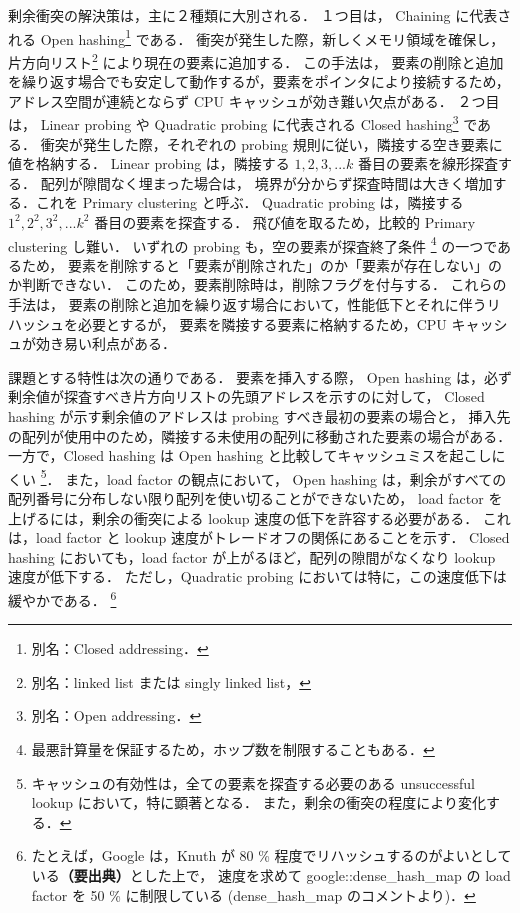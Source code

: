 剰余衝突の解決策は，主に２種類に大別される．
１つ目は，
Chaining に代表される Open hashing\footnote{別名：Closed addressing．} である．
衝突が発生した際，新しくメモリ領域を確保し，片方向リスト\footnote{別名：linked list または singly linked list，} により現在の要素に追加する．
この手法は，
要素の削除と追加を繰り返す場合でも安定して動作するが，要素をポインタにより接続するため，
アドレス空間が連続とならず CPU キャッシュが効き難い欠点がある．
２つ目は，
Linear probing や Quadratic probing に代表される Closed hashing\footnote{別名：Open addressing．} である．
衝突が発生した際，それぞれの probing 規則に従い，隣接する空き要素に値を格納する．
Linear probing は，隣接する $1, 2, 3, ... k$ 番目の要素を線形探査する．
配列が隙間なく埋まった場合は，
境界が分からず探査時間は大きく増加する．これを Primary clustering と呼ぶ．
Quadratic probing は，隣接する $1^2, 2^2, 3^2, ... k^2$ 番目の要素を探査する．
飛び値を取るため，比較的 Primary clustering し難い．
いずれの probing も，空の要素が探査終了条件 \footnote{最悪計算量を保証するため，ホップ数を制限することもある．} の一つであるため，
要素を削除すると「要素が削除された」のか「要素が存在しない」のか判断できない．
このため，要素削除時は，削除フラグを付与する．
これらの手法は，
要素の削除と追加を繰り返す場合において，性能低下とそれに伴うリハッシュを必要とするが，
要素を隣接する要素に格納するため，CPU キャッシュが効き易い利点がある．

課題とする特性は次の通りである．
要素を挿入する際，
Open hashing は，必ず剰余値が探査すべき片方向リストの先頭アドレスを示すのに対して，
Closed hashing が示す剰余値のアドレスは probing すべき最初の要素の場合と，
挿入先の配列が使用中のため，隣接する未使用の配列に移動された要素の場合がある．
一方で，Closed hashing は Open hashing と比較してキャッシュミスを起こしにくい
\footnote{キャッシュの有効性は，全ての要素を探査する必要のある unsuccessful lookup において，特に顕著となる．
また，剰余の衝突の程度により変化する．}．
また，load factor の観点において，
Open hashing は，剰余がすべての配列番号に分布しない限り配列を使い切ることができないため，
load factor を上げるには，剰余の衝突による lookup 速度の低下を許容する必要がある．
これは，load factor と  lookup 速度がトレードオフの関係にあることを示す．
Closed hashing においても，load factor が上がるほど，配列の隙間がなくなり lookup 速度が低下する．
ただし，Quadratic probing においては特に，この速度低下は緩やかである．
\footnote{たとえば，Google は，Knuth が 80 \% 程度でリハッシュするのがよいとしている{\bf \color{red}（要出典）}とした上で，
速度を求めて google::dense\_hash\_map の load factor を 50 \% に制限している (dense\_hash\_map のコメントより)．}

